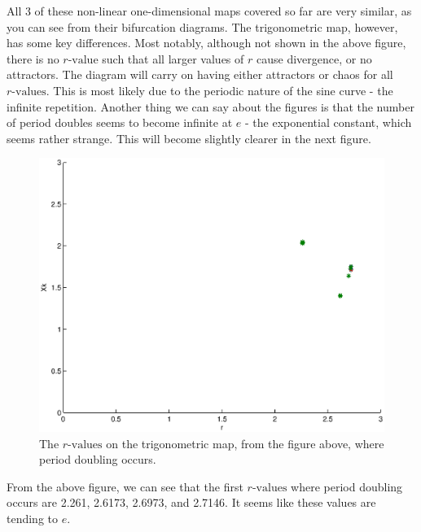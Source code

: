 \documentclass[a4wide, 10pt]{article}
\begin{document}
All 3 of these non-linear one-dimensional maps covered so far are very similar, as you can see from their bifurcation diagrams. 
 The trigonometric map, however, has
  some key differences. Most notably, although not shown in the above figure, there is no $r
   \textrm{-value}$ such that all larger values of $r$ cause divergence, or no attractors. The diagram
    will carry on having either  attractors or chaos for all $r \textrm{-values}$. This is most likely due to the periodic nature of the sine curve - the infinite repetition. 
          Another thing we can say about the figures is that the number of period doubles seems to
           become infinite at $e$ - the exponential constant, which seems rather strange. This will
            become slightly clearer in the next figure.


\begin{figure}[H]

    \centering

    \includegraphics[scale=0.2]{EPSFiles/MAINTrigonometricPointsEPS}

    \caption{The $r \textrm{-values}$ on the trigonometric map, from the figure above, where period doubling occurs.}

\end{figure} 

From the above figure, we can see that the first $r \textrm{-values}$ where period doubling occurs are
 2.261, 2.6173, 2.6973, and 2.7146. It seems like these values are tending to $e$.
\end{document}
